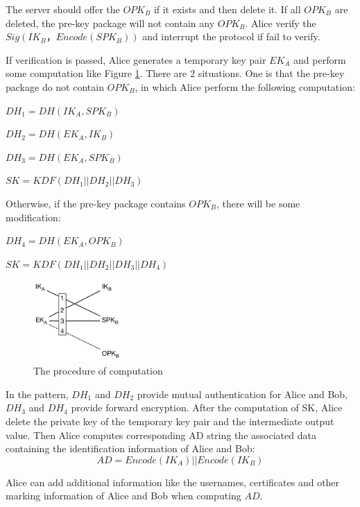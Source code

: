 \documentclass[11pt,en]{elegantpaper}
\begin{document}
The server should offer the $OPK_B$ if it exists and then delete it. If all $OPK_B$ are deleted, the pre-key package will not contain any $OPK_B$. Alice verify the $Sig(IK_B，Encode(SPK_B))$ and interrupt the protocol if fail to verify.

If verification is passed, Alice generates a temporary key pair $EK_A$ and perform some computation like Figure \ref{x3dh1}. There are 2 situations. One is that the pre-key package do not contain $OPK_B$, in which Alice perform the following computation:

\begin{center}
    $DH_1=DH(IK_A,SPK_B)$

    $DH_2=DH(EK_A,IK_B)$

    $DH_3=DH(EK_A,SPK_B)$

    $SK=KDF(DH_1||DH_2||DH_3)$
\end{center}


Otherwise, if the pre-key package contains $OPK_B$, there will be some modification:
\begin{center}
    $DH_4=DH(EK_A,OPK_B)$

    $SK=KDF(DH_1||DH_2||DH_3||DH_4)$
\end{center}




\begin{figure}[H]
    \centering
    \includegraphics[width=0.3\textwidth]{image/X3DH}
    \caption{The procedure of computation}
    \label{x3dh1}
\end{figure}

In the pattern, $DH_1$ and $DH_2$ provide mutual authentication for Alice and Bob, $DH_3$ and $DH_4$ provide forward encryption. After the computation of SK, Alice delete the private key of the temporary key pair and the intermediate output value. Then Alice computes corresponding AD string the associated data containing the identification information of Alice and Bob:
$$AD=Encode(IK_A)||Encode(IK_B)$$


Alice can add additional information like the usernames, certificates and other marking information of Alice and Bob when computing $AD$.
\end{document}

